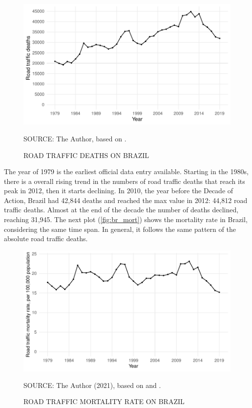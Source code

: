 \begin{figure}[!htbp]
    \centering\footnotesize
    \captionsetup{font=footnotesize}
    \caption{ROAD TRAFFIC DEATHS ON BRAZIL}
    \includegraphics{fig/brazil_abs.pdf}
    \label{fig:br_abs}
    \par SOURCE: The Author, based on \textcite{MinistryofHealth2020}.
\end{figure}

The year of 1979 is the earliest official data entry available. Starting in the 1980s, there is a overall rising trend in the numbers of road traffic deaths that reach its peak in 2012, then it starts declining. In 2010, the year before the Decade of Action, Brazil had 42,844 deaths and reached the max value in 2012: 44,812 road traffic deaths. Almost at the end of the decade the number of deaths declined, reaching 31,945. The next plot (\autoref{fig:br_mort}) shows the mortality rate in Brazil, considering the same time span. In general, it follows the same pattern of the absolute road traffic deaths.

\begin{figure}[!htbp]
    \centering\footnotesize
    \captionsetup{font=footnotesize}
    \caption{ROAD TRAFFIC MORTALITY RATE ON BRAZIL}
    \includegraphics{fig/brazil_mort.pdf}
    \label{fig:br_mort}
    \par SOURCE: The Author (2021), based on \textcite{MinistryofHealth2020} and \textcite{MinistryofHealth2021}.
\end{figure}

